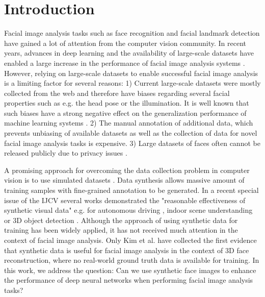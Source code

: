 \documentclass[10pt,twocolumn,letterpaper]{article}
\begin{document}
	\section{Introduction}
    Facial image analysis tasks such as face recognition and facial landmark detection have gained a lot of attention from the computer vision community. In recent years, advances in deep learning \cite{krizhevsky2012imagenet} and the availability of large-scale datasets have enabled a large increase in the performance of facial image analysis systems \cite{taigman2014deepface,schroff2015facenet,ranjan2017hyperface}. 
    However, relying on large-scale datasets to enable successful facial image analysis is a limiting factor for several reasons: 
    1) Current large-scale datasets were mostly collected from the web and therefore have biases regarding several facial properties such as e.g. the head pose or the illumination. It is well known that such biases have a strong negative effect on the generalization performance of machine learning systems \cite{torralba2011unbiased,kortylewski2017empirically,tommasi2017deeper}. 2) The manual annotation of additional data, which prevents unbiasing of available datasets as well as the collection of data for novel facial image analysis tasks is expensive. 3) Large datasets of faces often cannot be released publicly due to privacy issues \cite{schroff2015facenet}.
        
	A promising approach for overcoming the data collection problem in computer vision is to use simulated datasets \cite{qiu2016unrealcv,jaderberg2014synthetic,butler2012naturalistic,chen2015deepdriving,gaidon2016virtual,park2015articulated}. Data synthesis allows massive amount of training samples with fine-grained annotation to be generated. In a recent special issue of the IJCV \cite{gaidon2018reasonable} several works demonstrated the "reasonable effectiveness of synthetic visual data" e.g. for autonomous driving \cite{muller2018sim4cv}, indoor scene understanding \cite{jiang2018configurable} or 3D object detection \cite{loing2018virtual}. Although the approach of using synthetic data for training has been widely applied, it has not received much attention in the context of facial image analysis.
	Only Kim et al. \cite{kim2017inversefacenet} have collected the first evidence that synthetic data is useful for facial image analysis in the context of 3D face reconstruction, where no real-world ground truth data is available for training.	In this work, we address the question: Can we use synthetic face images to enhance the performance of deep neural networks when performing facial image analysis tasks?
	
\end{document}
